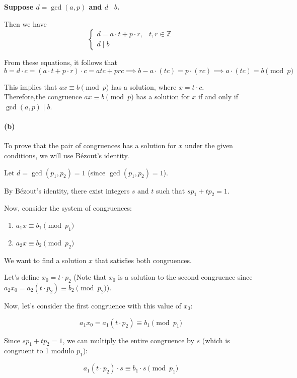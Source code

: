 \documentclass[12pt]{article}
\begin{document}
\textbf{Suppose $d = \gcd(a, p)$ and $d \mid b$.}

Then we have
\[
\begin{cases}
    d = a \cdot t + p \cdot r, & \text{$t, r \in \mathbb{Z}$} \\
    d \mid b
\end{cases}
\]

From these equations, it follows that
\[
b = d \cdot c = (a \cdot t + p \cdot r) \cdot c = atc + prc \implies b - a \cdot (tc) = p \cdot (rc) \implies a \cdot (tc) = b \pmod{p}
\]

This implies that $ax \equiv b \pmod{p}$ has a solution, where $x = t \cdot c$. \\

Therefore,the congruence $ax \equiv b \pmod{p}$ has a solution for $x$ if and only if $\gcd(a, p) \mid b$.
\paragraph{(b)}

To prove that the pair of congruences has a solution for \(x\) under the given conditions, we will use Bézout's identity.

Let \(d = \gcd(p_1, p_2) = 1\) (since \(\gcd(p_1, p_2) = 1\)).

By Bézout's identity, there exist integers \(s\) and \(t\) such that \(sp_1 + tp_2 = 1\).

Now, consider the system of congruences:

\begin{enumerate}
  \item \(a_1x \equiv b_1 \pmod{p_1}\)
  \item \(a_2x \equiv b_2 \pmod{p_2}\)
\end{enumerate}

We want to find a solution \(x\) that satisfies both congruences.

Let's define \(x_0 = t \cdot p_2\) (Note that \(x_0\) is a solution to the second congruence since \(a_2x_0 = a_2(t \cdot p_2) \equiv b_2 \pmod{p_2}\)).

Now, let's consider the first congruence with this value of \(x_0\):

\[a_1x_0 = a_1(t \cdot p_2) \equiv b_1 \pmod{p_1}\]

Since \(sp_1 + tp_2 = 1\), we can multiply the entire congruence by \(s\) (which is congruent to 1 modulo \(p_1\)):

\[a_1(t \cdot p_2) \cdot s \equiv b_1 \cdot s \pmod{p_1}\]
\end{document}
